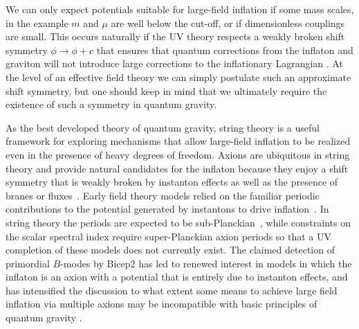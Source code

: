We can only expect potentials suitable for large-field inflation if some mass scales, in the example $m$ and $\mu$ are well below the cut-off, or if dimensionless couplings are small. This occurs naturally if the UV theory respects a weakly broken shift symmetry $\phi\rightarrow\phi+c$ that ensures that quantum corrections from the inflaton and graviton will not introduce large corrections to the inflationary Lagrangian \cite{Linde:2005ht, Kaloper:2011jz, Csaki:2014bua,Kaplan:2015fuy,Choi:2015fiu}. At the level of an effective field theory we can simply postulate such an approximate shift symmetry, but one should keep in mind that we ultimately require the existence of such a symmetry in quantum gravity. 

As the best developed theory of quantum gravity, string theory is a useful framework for exploring mechanisms that allow large-field inflation to be realized even in the presence of heavy degrees of freedom. Axions are ubiquitous in string theory and provide natural candidates for the inflaton because they enjoy a shift symmetry that is weakly broken by instanton effects as well as the presence of branes or fluxes~\cite{Wen:1985jz}. Early field theory models relied on the familiar periodic contributions to the potential generated by instantons to drive inflation~\cite{Freese:1990rb,Adams:1992bn}. In string theory the periods are expected to be sub-Planckian~\cite{Banks:2003sx,ArkaniHamed:2006dz}, while constraints on the scalar spectral index require super-Planckian axion periods so that a UV completion of these models does not currently exist. The claimed detection of primordial $B$-modes by {\sc Bicep}2 has led to renewed interest in models in which the inflaton is an axion with a potential that is entirely due to instanton effects, and has intensified the discussion to what extent some means to achieve large field inflation via multiple axions may be incompatible with basic principles of quantum gravity \cite{Kim:2004rp,Rudelius:2014wla,delaFuente:2014aca,Rudelius:2015xta,Brown:2015iha,Bachlechner:2015qja,Brown:2015lia,Heidenreich:2015wga,Heidenreich:2015nta,Kooner:2015rza}.

